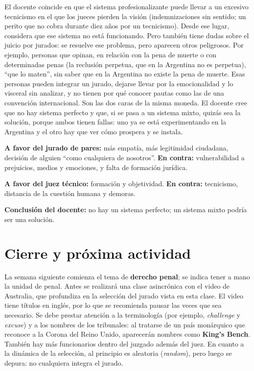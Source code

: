 \documentclass[12pt,oneside]{book}
\begin{document}
El docente coincide en que el sistema profesionalizante puede llevar a un excesivo tecnicismo en el que los jueces pierden la visión (indemnizaciones sin sentido; un perito que no cobra durante diez años por un tecnicismo). Desde ese lugar, considera que ese sistema no está funcionando. Pero también tiene dudas sobre el juicio por jurados: se resuelve ese problema, pero aparecen otros peligrosos. Por ejemplo, personas que opinan, en relación con la pena de muerte o con determinadas penas (la reclusión perpetua, que en la Argentina no es perpetua), ``que lo maten'', sin saber que en la Argentina no existe la pena de muerte. Esas personas pueden integrar un jurado, dejarse llevar por la emocionalidad y lo visceral sin analizar, y no tienen por qué conocer pautas como las de una convención internacional. Son las dos caras de la misma moneda. El docente cree que no hay sistema perfecto y que, si se pasa a un sistema mixto, quizás sea la solución, porque ambos tienen fallas: uno ya se está experimentando en la Argentina y el otro hay que ver cómo prospera y se instala.

\begin{important}
\textbf{A favor del jurado de pares:} más empatía, más legitimidad ciudadana, decisión de alguien ``como cualquiera de nosotros''. \textbf{En contra:} vulnerabilidad a prejuicios, medios y emociones, y falta de formación jurídica.

\textbf{A favor del juez técnico:} formación y objetividad. \textbf{En contra:} tecnicismo, distancia de la cuestión humana y demoras.

\textbf{Conclusión del docente:} no hay un sistema perfecto; un sistema mixto podría ser una solución.
\end{important}

\section{Cierre y próxima actividad}

La semana siguiente comienza el tema de \textbf{derecho penal}; se indica tener a mano la unidad de penal. Antes se realizará una clase asincrónica con el video de Australia, que profundiza en la selección del jurado vista en esta clase. El video tiene títulos en inglés, por lo que se recomienda pausar las veces que sea necesario. Se debe prestar atención a la terminología (por ejemplo, \textit{challenge} y \textit{excuse}) y a los nombres de los tribunales: al tratarse de un país monárquico que reconoce a la Corona del Reino Unido, aparecerán nombres como \textbf{King's Bench}. También hay más funcionarios dentro del juzgado además del juez. En cuanto a la dinámica de la selección, al principio es aleatoria (\textit{random}), pero luego se depura: no cualquiera integra el jurado.
\end{document}
